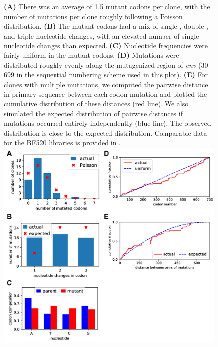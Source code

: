\documentclass[9pt]{elife}
\begin{document}
\begin{figure}
{{\bf(A)} There was an average of 1.5 mutant codons per clone, with the number of mutations per clone roughly following a Poisson distribution. 
{\bf(B)} The mutant codons had a mix of single-, double-, and triple-nucleotide changes, with an elevated number of single-nucleotide changes than expected.
{\bf(C)} Nucleotide frequencies were fairly uniform in the mutant codons.
{\bf(D)} Mutations were distributed roughly evenly along the mutagenized region of {\it env} (30-699 in the sequential numbering scheme used in this plot).
{\bf(E)} For clones with multiple mutations, we computed the pairwise distance in primary sequence between each codon mutation and plotted the cumulative distribution of these distances (red line). 
We also simulated the expected distribution of pairwise distances if mutations occurred entirely independently (blue line). 
The observed distribution is close to the expected distribution.
Comparable data for the BF520 libraries is provided in \citet{dingens2017comprehensive}.
}{\includegraphics[width=\textwidth]{figures/sanger_sequencing_supp/sanger_sequencing_supp.pdf}}
\end{figure}
\end{document}

